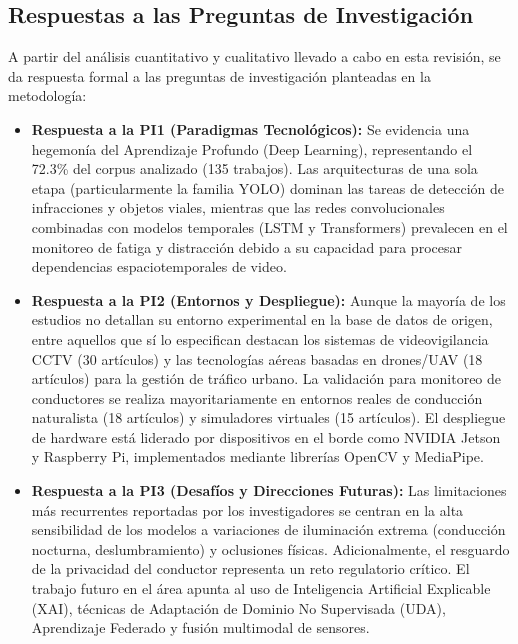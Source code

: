 \subsection{Respuestas a las Preguntas de Investigación}
A partir del análisis cuantitativo y cualitativo llevado a cabo en esta revisión, se da respuesta formal a las preguntas de investigación planteadas en la metodología:
\begin{itemize}
    \item \textbf{Respuesta a la PI1 (Paradigmas Tecnológicos):} Se evidencia una hegemonía del Aprendizaje Profundo (Deep Learning), representando el 72.3\% del corpus analizado (135 trabajos). Las arquitecturas de una sola etapa (particularmente la familia YOLO) dominan las tareas de detección de infracciones y objetos viales, mientras que las redes convolucionales combinadas con modelos temporales (LSTM y Transformers) prevalecen en el monitoreo de fatiga y distracción debido a su capacidad para procesar dependencias espaciotemporales de video.
    \item \textbf{Respuesta a la PI2 (Entornos y Despliegue):} Aunque la mayoría de los estudios no detallan su entorno experimental en la base de datos de origen, entre aquellos que sí lo especifican destacan los sistemas de videovigilancia CCTV (30 artículos) y las tecnologías aéreas basadas en drones/UAV (18 artículos) para la gestión de tráfico urbano. La validación para monitoreo de conductores se realiza mayoritariamente en entornos reales de conducción naturalista (18 artículos) y simuladores virtuales (15 artículos). El despliegue de hardware está liderado por dispositivos en el borde como NVIDIA Jetson y Raspberry Pi, implementados mediante librerías OpenCV y MediaPipe.
    \item \textbf{Respuesta a la PI3 (Desafíos y Direcciones Futuras):} Las limitaciones más recurrentes reportadas por los investigadores se centran en la alta sensibilidad de los modelos a variaciones de iluminación extrema (conducción nocturna, deslumbramiento) y oclusiones físicas. Adicionalmente, el resguardo de la privacidad del conductor representa un reto regulatorio crítico. El trabajo futuro en el área apunta al uso de Inteligencia Artificial Explicable (XAI), técnicas de Adaptación de Dominio No Supervisada (UDA), Aprendizaje Federado y fusión multimodal de sensores.
\end{itemize}
